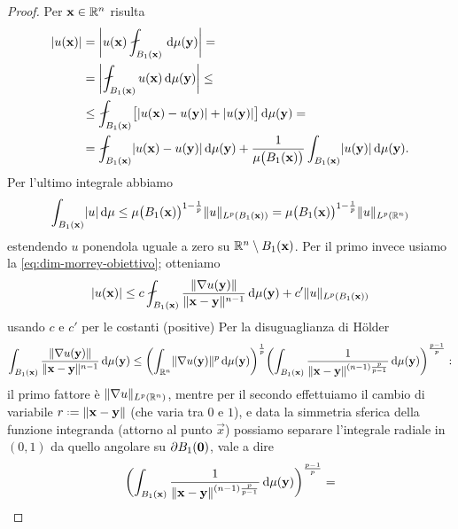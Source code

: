 \begin{proof}
    Per $\vec x\in\R^n$ risulta
    \begin{equation}
        \begin{split}
            \abs{u(\vec x)}&=
            \abs[\bigg]{u(\vec x)\avint_{B_1(\vec x)} \,\dd\mu(\vec y)}=\\ &=
            \abs[\bigg]{\avint_{B_1(\vec x)} u(\vec x)\,\dd\mu(\vec y)}\le\\ &\le
            \avint_{B_1(\vec x)}\bigl[\abs{u(\vec x)-u(\vec y)}+\abs{u(\vec y)}\bigr]\,\dd\mu(\vec y)=\\ &=
            \avint_{B_1(\vec x)}\abs{u(\vec x)-u(\vec y)}\,\dd\mu(\vec y)+\frac1{\mu\bigl(B_1(\vec x)\bigr)}\int_{B_1(\vec x)}\abs{u(\vec y)}\,\dd\mu(\vec y).
        \end{split}
    \end{equation}
    Per l'ultimo integrale abbiamo
    \begin{equation}
        \int_{B_1(\vec x)}\abs{u}\,\dd\mu\le
        \mu\bigl(B_1(\vec x)\bigr)^{1-\frac1{p}}\norm{u}_{\leb[p]{B_1(\vec x)}}=
        \mu\bigl(B_1(\vec x)\bigr)^{1-\frac1{p}}\norm{u}_{\leb[p]{\R^n}}
    \end{equation}
    estendendo $u$ ponendola uguale a zero su $\R^n\setminus B_1(\vec x)$.
    Per il primo invece usiamo la \eqref{eq:dim-morrey-obiettivo}; otteniamo
    \begin{equation}
        \abs{u(\vec x)}\le c\avint_{B_1(\vec x)} \frac{\norm{\grad u(\vec y)}}{\norm{\vec x-\vec y}^{n-1}}\,\dd\mu(\vec y)+c'\norm{u}_{\leb[p]{B_1(\vec x)}}
    \end{equation}
    usando $c$ e $c'$ per le costanti (positive)
    Per la disuguaglianza di Hölder
    \begin{equation}
        \int_{B_1(\vec x)} \frac{\norm{\grad u(\vec y)}}{\norm{\vec x-\vec y}^{n-1}}\,\dd\mu(\vec y)\le
        \biggl(\int_{\R^n}\norm{\grad u(\vec y)}^p\,\dd\mu(\vec y)\biggr)^\frac1{p}\biggl(\int_{B_1(\vec x)}\frac1{\norm{\vec x-\vec y}^{(n-1)\frac{p}{p-1}}}\,\dd\mu(\vec y)\biggr)^\frac{p-1}{p}:
    \end{equation}
    il primo fattore è $\norm{\grad u}_{\leb[p]{\R^n}}$, mentre per il secondo effettuiamo il cambio di variabile $r\defeq\norm{\vec x-\vec y}$ (che varia tra $0$ e $1$), e data la simmetria sferica della funzione integranda (attorno al punto $\vec x$) possiamo separare l'integrale radiale in $(0,1)$ da quello angolare su $\boundary B_1(\vec 0)$, vale a dire
    \begin{multline}
        \biggl(\int_{B_1(\vec x)}\frac1{\norm{\vec x-\vec y}^{(n-1)\frac{p}{p-1}}}\,\dd\mu(\vec y)\biggr)^\frac{p-1}{p}=

\end{multline}
\end{proof}

